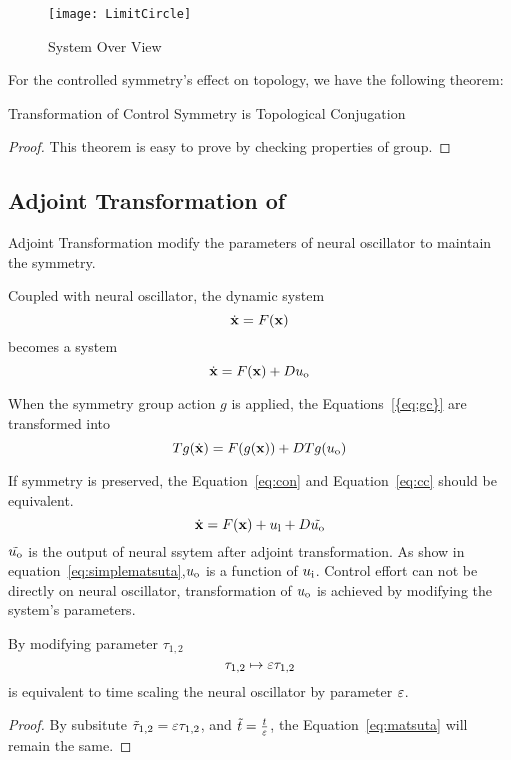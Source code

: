 \begin{figure}[!htbp]
  \begin{center}
      \texttt{[image: LimitCircle]}
    \caption{System Over View }
    \label{fig:sysoverview}
  \end{center}
\end{figure}


For the controlled symmetry's effect on topology, we have the following theorem:

\begin{mythe}
Transformation of Control Symmetry is Topological Conjugation
\end{mythe}
\begin{proof}
This theorem is easy to prove by checking properties of group.
\end{proof}

\subsection{Adjoint Transformation of \cpg}
Adjoint Transformation modify the parameters of neural oscillator to maintain the symmetry.

Coupled with neural oscillator, the dynamic system 
\[
\dot{\mathbf{x}}=F(\mathbf{x})
\]
becomes a system 
\begin{equation}
\label{eq:gc}
\dot{\mathbf{x}}=F(\mathbf{x})+Du_{\mathrm{o}}
\end{equation}


When the symmetry group action $g$ is applied, the Equations~\ref{{eq:gc}} are transformed into
\begin{equation}
\label{eq:cc}
Tg(\dot{\mathbf{x}})=F(g(\mathbf{x}))+DTg(u_{\mathrm{o}})
\end{equation}




If symmetry is preserved, the Equation~\ref{eq:con} and Equation~\ref{eq:cc} should be equivalent.
\begin{equation}
\label{eq:con}
\dot{\mathbf{x}}=F(\mathbf{x})+u_{\mathrm{l}}+D\tilde{u_{\mathrm{o}}}
\end{equation}
$\tilde{u_{\mathrm{o}}}$ is the output of neural ssytem after adjoint transformation.
As show in equation~\ref{eq:simplematsuta},$u_{\mathrm{o}}$ is a function of $u_{\mathrm{i}}$.
Control effort can not be directly on neural oscillator, transformation of $u_{\mathrm{o}}$ is achieved by modifying the system's parameters.



\begin{myprop}
By modifying parameter $\tau_{1,2}$
\[
\tau_{1,2} \mapsto \varepsilon \tau_{1,2}
\]
is equivalent to time scaling the neural oscillator by parameter $\varepsilon$.
\end{myprop}
\begin{proof}
By subsitute $\tilde{\tau}_{1,2}=\varepsilon \tau_{1,2}$, and $\tilde{t}=\frac{t}{\varepsilon}$, the Equation~\ref{eq:matsuta} will remain the same.
\end{proof}

